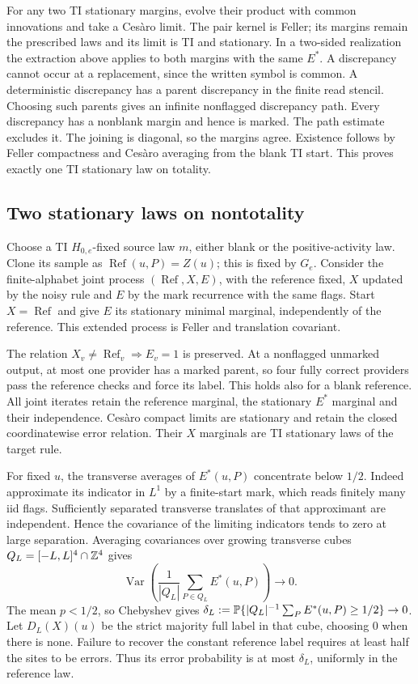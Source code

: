 For any two TI stationary margins, evolve their product with common innovations and take a Ces\`aro limit. The pair kernel is Feller; its margins remain the prescribed laws and its limit is TI and stationary. In a two-sided realization the extraction above applies to both margins with the same $E^*$. A discrepancy cannot occur at a replacement, since the written symbol is common. A deterministic discrepancy has a parent discrepancy in the finite read stencil. Choosing such parents gives an infinite nonflagged discrepancy path. Every discrepancy has a nonblank margin and hence is marked. The path estimate excludes it. The joining is diagonal, so the margins agree. Existence follows by Feller compactness and Ces\`aro averaging from the blank TI start. This proves exactly one TI stationary law on totality.

\subsection{Two stationary laws on nontotality}

Choose a TI $H_{0,e}$-fixed source law $m$, either blank or the positive-activity law. Clone its sample as $\operatorname{Ref}(u,P)=Z(u)$; this is fixed by $G_e$. Consider the finite-alphabet joint process $(\operatorname{Ref},X,E)$, with the reference fixed, $X$ updated by the noisy rule and $E$ by the mark recurrence with the same flags. Start $X=\operatorname{Ref}$ and give $E$ its stationary minimal marginal, independently of the reference. This extended process is Feller and translation covariant.

The relation $X_v\ne\operatorname{Ref}_v\Rightarrow E_v=1$ is preserved. At a nonflagged unmarked output, at most one provider has a marked parent, so four fully correct providers pass the reference checks and force its label. This holds also for a blank reference. All joint iterates retain the reference marginal, the stationary $E^*$ marginal and their independence. Ces\`aro compact limits are stationary and retain the closed coordinatewise error relation. Their $X$ marginals are TI stationary laws of the target rule.

For fixed $u$, the transverse averages of $E^*(u,P)$ concentrate below $1/2$. Indeed approximate its indicator in $L^1$ by a finite-start mark, which reads finitely many iid flags. Sufficiently separated transverse translates of that approximant are independent. Hence the covariance of the limiting indicators tends to zero at large separation. Averaging covariances over growing transverse cubes $Q_L=[-L,L]^4\cap\mathbb{Z}^4$ gives
\[
 \operatorname{Var}\left(\frac1{|Q_L|}\sum_{P\in Q_L}E^*(u,P)\right)\longrightarrow0.
\]
The mean $p<1/2$, so Chebyshev gives $\delta_L:=\mathbb{P}\{|Q_L|^{-1}\sum_PE^*(u,P)\ge1/2\}\to0$. Let $D_L(X)(u)$ be the strict majority full label in that cube, choosing $0$ when there is none. Failure to recover the constant reference label requires at least half the sites to be errors. Thus its error probability is at most $\delta_L$, uniformly in the reference law.

